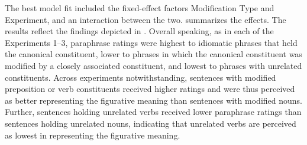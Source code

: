 \documentclass[output=paper]{langsci/langscibook}
\begin{document}
The best model fit included the fixed-effect factors Modification Type and Experiment, and an interaction between the two.   summarizes the effects. The results reflect the findings depicted in .  Overall speaking, as in each of the Experiments 1--3, paraphrase ratings were highest to idiomatic phrases that held the canonical constituent, lower to phrases in which the canonical constituent was modified by a closely associated constituent, and lowest to phrases with unrelated constituents. Across experiments notwithstanding, sentences with modified preposition or verb constituents received higher ratings and were thus perceived as better representing the figurative meaning than sentences with modified nouns. Further, sentences holding unrelated verbs received lower paraphrase ratings than sentences holding unrelated nouns, indicating that unrelated verbs are perceived as lowest in representing the figurative meaning. 

\begin{table}
\caption{Fixed effects of the predictors in the linear mixed-effect model for the paraphrase ratings combining Experiments 1--3. \textit{Notes:} Modified = modified constituent, Unrelated = unrelated constituent, Exp. = Experiment, significance code: *** < 0.0001, * < 0.05.\label{tab:Table8}}
\end{table}
\end{document}
